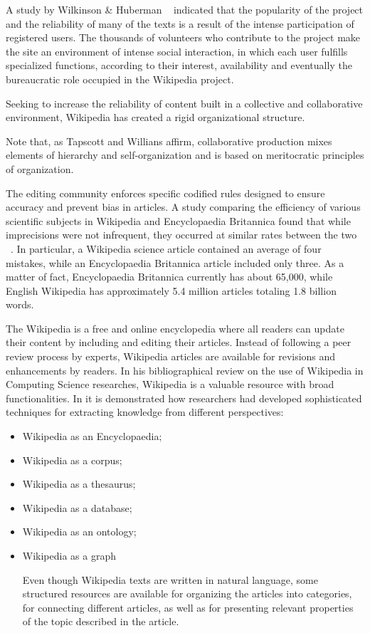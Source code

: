 A study by Wilkinson \& Huberman ~\cite{wilkinson2007assessing} indicated that the popularity of the project and the reliability of many of the texts is a result of the intense participation of registered users.
The thousands of volunteers who contribute to the project make the site an environment of intense social interaction, in which each user fulfills specialized functions, according to their interest, availability and eventually the bureaucratic role occupied in the Wikipedia project. 


Seeking to increase the reliability of content built in a collective and collaborative environment, Wikipedia has created a rigid organizational structure. 

Note that, as Tapscott and Willians \cite{tapscott2008wikinomics} affirm, collaborative production mixes elements of hierarchy and self-organization and is based on meritocratic principles of organization.

The editing community enforces specific codified rules designed to ensure accuracy and prevent bias in articles. A study comparing the efficiency of various scientific subjects in Wikipedia and Encyclopaedia Britannica found that while imprecisions were not infrequent, they occurred at similar rates between the two ~\cite{giles2005internet}. In particular, a Wikipedia science article contained an average of four mistakes, while an Encyclopaedia Britannica article included only three. 
As a matter of fact, Encyclopaedia Britannica currently has about 65,000, while English Wikipedia has approximately 5.4 million articles totaling 1.8 billion words. 


The Wikipedia is a free and online encyclopedia where all readers can update their content by including and editing their articles. Instead of following a peer review process by experts, Wikipedia articles are available for revisions and enhancements by readers. In his bibliographical review on the use of Wikipedia in Computing Science researches,  Wikipedia is a  valuable resource with broad functionalities.  In \cite{medelyan2009mining} it is demonstrated how researchers had developed sophisticated techniques for extracting knowledge from different perspectives:



\begin{itemize}
\item Wikipedia as an Encyclopaedia; 


\item Wikipedia as a corpus; 
\item Wikipedia as a thesaurus; 
\item Wikipedia as a database; 
\item Wikipedia as an ontology; 
\item Wikipedia as a graph


Even though Wikipedia texts are written in natural language, some structured resources are available for organizing the articles into categories, for connecting different articles, as well as for presenting relevant properties of the topic described in the article.

\end{itemize}
